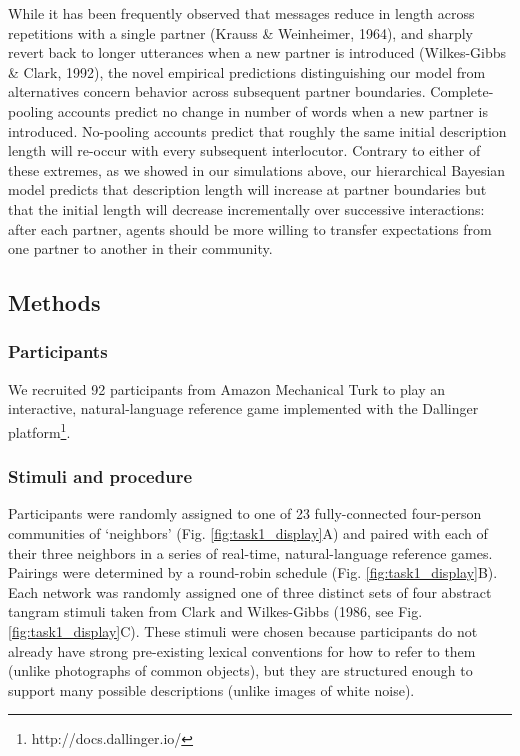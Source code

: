 \documentclass[10pt, letterpaper]{article}
\begin{document}
While it has been frequently observed that messages reduce in length
across repetitions with a single partner (Krauss \& Weinheimer, 1964),
and sharply revert back to longer utterances when a new partner is
introduced (Wilkes-Gibbs \& Clark, 1992), the novel empirical
predictions distinguishing our model from alternatives concern behavior
across subsequent partner boundaries. Complete-pooling accounts predict
no change in number of words when a new partner is introduced.
No-pooling accounts predict that roughly the same initial description
length will re-occur with every subsequent interlocutor. Contrary to
either of these extremes, as we showed in our simulations above, our
hierarchical Bayesian model predicts that description length will
increase at partner boundaries but that the initial length will decrease
incrementally over successive interactions: after each partner, agents
should be more willing to transfer expectations from one partner to
another in their community.

\hypertarget{methods}{%
\subsection{Methods}\label{methods}}

\hypertarget{participants}{%
\subsubsection{Participants}\label{participants}}

We recruited 92 participants from Amazon Mechanical Turk to play an
interactive, natural-language reference game implemented with the
Dallinger platform\footnote{http://docs.dallinger.io/}.

\hypertarget{stimuli-and-procedure}{%
\subsubsection{Stimuli and procedure}\label{stimuli-and-procedure}}

Participants were randomly assigned to one of 23 fully-connected
four-person communities of `neighbors' (Fig. \ref{fig:task1_display}A)
and paired with each of their three neighbors in a series of real-time,
natural-language reference games. Pairings were determined by a
round-robin schedule (Fig. \ref{fig:task1_display}B). Each network was
randomly assigned one of three distinct sets of four abstract tangram
stimuli taken from Clark and Wilkes-Gibbs (1986, see Fig.
\ref{fig:task1_display}C). These stimuli were chosen because
participants do not already have strong pre-existing lexical conventions
for how to refer to them (unlike photographs of common objects), but
they are structured enough to support many possible descriptions (unlike
images of white noise).
\end{document}
